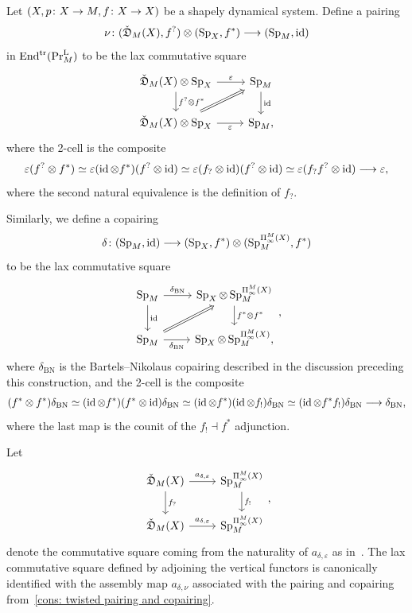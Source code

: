 \begin{cons}\label{cons: twisted pairing and copairing}
  Let $(X,p\colon X\to M ,f\colon X\to X )$ be a shapely dynamical system. Define a pairing \[\nu\colon (\check{\mathfrak{D}}_{M}(X) ,f^?)\otimes (\operatorname{Sp}_{X} ,f^*)\longrightarrow (\operatorname{Sp}_M ,\operatorname{id})\] in $\mathrm{End}^{\mathrm{tr}} (\mathrm{Pr}^{\mathrm{L}}_{M})$ to be the lax commutative square
  \[
    \begin{tikzcd}
      {\coShat_\base(\tset)\otimes\D\tset} & \Sp_\base\\
      {\coShat_\base(\tset)\otimes\D\tset} & \Sp_\base,
      \arrow["{\varepsilon}", from=1-1, to=1-2]
      \arrow["{f^?\otimes f^*}", from=1-1, to=2-1]
      \arrow["\id", from=1-2, to=2-2]
      \arrow[Rightarrow, from=2-1, to=1-2]
      \arrow["{\varepsilon}"', from=2-1, to=2-2]
    \end{tikzcd}
  \]
  where the 2-cell is the composite
  \[
    \varepsilon (f^?\otimes f^*)\simeq \varepsilon (\operatorname{id}\otimes f^*)(f^?\otimes \operatorname{id})\simeq\varepsilon (f_?\otimes\operatorname{id} )(f^?\otimes\operatorname{id})\simeq\varepsilon (f_?f^?\otimes\operatorname{id})\longrightarrow\varepsilon, 
  \]
  where the second natural equivalence is the definition of $f_?$.

  Similarly, we define a copairing
  \[
    \delta\colon (\Sp_\base ,\id)\too (\D\tset ,f^*)\otimes (\Sp_\base^{\ani{\tset}[\base]},f^*)
  \]
  to be the lax commutative square
  \[
    \begin{tikzcd}
      {\Sp_\base} & \D\tset\otimes\Sp_\base^{\ani{\tset}[\base]}\\
      {\Sp_\base} & \D\tset\otimes\Sp_\base^{\ani{\tset}[\base]},
      \arrow["{\delta_{\mathrm{BN}}}", from=1-1, to=1-2]
      \arrow["{\id}", from=1-1, to=2-1]
      \arrow["{f^*\otimes f^*}", from=1-2, to=2-2]
      \arrow[Rightarrow, from=2-1, to=1-2]
      \arrow["{\delta_{\mathrm{BN}}}"', from=2-1, to=2-2]
    \end{tikzcd},
  \]
  where $\delta_{\mathrm{BN}}$ is the Bartels--Nikolaus copairing described in the discussion preceding this construction, and the 2-cell is the composite
  \[
    (f^*\otimes f^*)\delta_{\mathrm{BN}}\simeq (\operatorname{id}\otimes f^*)(f^*\otimes\operatorname{id})\delta_{\mathrm{BN}}\simeq (\operatorname{id}\otimes f^*)(\operatorname{id}\otimes f_!)\delta_{\mathrm{BN}}\simeq (\operatorname{id}\otimes f^*f_!)\delta_{\mathrm{BN}}\longrightarrow \delta_{\mathrm{BN}},
  \]
  where the last map is the counit of the $f_!\dashv f^*$ adjunction.
\end{cons}
\begin{lem}\label{lem: twisted assembly is adjoint of assembly}
  Let
  \[
    \begin{tikzcd}
      \pcoShat\base\tset\arrow[d,"f_?"] \arrow[r,"a_{\delta ,\varepsilon}"] & \Sp_\base^{\ani{\tset}[\base]}\arrow[d,"f_!"]\\
      \pcoShat\base\tset\arrow[r,"a_{\delta ,\varepsilon }"] & \Sp_\base^{\ani{\tset}[\base]}
    \end{tikzcd},
  \]
  denote the commutative square coming from the naturality of $a_{\delta ,\varepsilon }$ as in~\cite[Thm~8.14]{Mukherjee_Nikolaus2026}. The lax commutative square defined by adjoining the vertical functors is canonically identified with the assembly map $a_{\delta ,\nu}$ associated with the pairing and copairing from~\cref{cons: twisted pairing and copairing}.
\end{lem}
